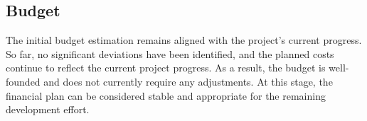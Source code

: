 \subsection{Budget}

The initial budget estimation remains aligned with the project's current progress. So far, no significant deviations have been identified, and the planned costs continue to reflect the current project progress. As a result, the budget is well-founded and does not currently require any adjustments. At this stage, the financial plan can be considered stable and appropriate for the remaining development effort.